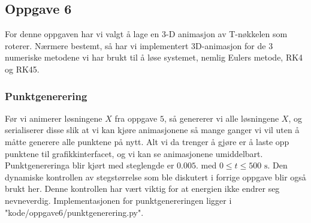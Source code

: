 \subsection{Oppgave 6}
\label{section:oppgave6}
For denne oppgaven har vi valgt å lage en 3-D animasjon av T-nøkkelen som roterer. Nærmere bestemt, så har vi implementert 3D-animasjon for de $3$ numeriske metodene vi har brukt til å løse systemet, nemlig Eulers metode, RK4 og RK45.

\subsubsection{Punktgenerering}
Før vi animerer løsningene $X$ fra oppgave $5$, så genererer vi alle løsningene $X$, og serialiserer disse slik at vi kan kjøre animasjonene så mange ganger vi vil uten å måtte generere alle punktene på nytt. Alt vi da trenger å gjøre er å laste opp punktene til grafikkinterfacet, og vi kan se animasjonene umiddelbart. Punktgenereringa blir kjørt med steglengde er $0.005.$ med $0\leq t \leq 500\text{ s}.$ Den dynamiske kontrollen av stegstørrelse som ble diskutert i forrige oppgave blir også brukt her. Denne kontrollen har vært viktig for at energien ikke endrer seg nevneverdig. Implementasjonen for punktgenereringen ligger i "kode/oppgave6/punktgenerering.py".

